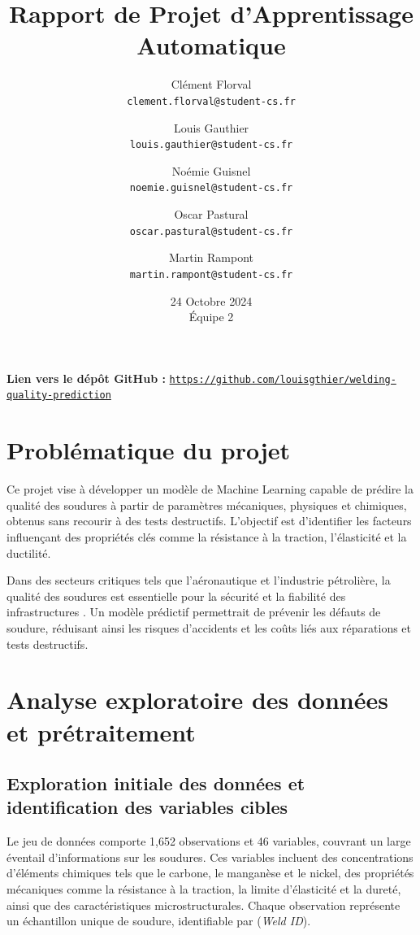 \documentclass{article}
\title{\LARGE \textbf{Rapport de Projet d'Apprentissage Automatique}}
\author{
    \normalsize Clément Florval\\
    \small \texttt{clement.florval@student-cs.fr}
    \and
    \normalsize Louis Gauthier\\
    \small \texttt{louis.gauthier@student-cs.fr}
    \and
    \normalsize Noémie Guisnel\\
    \small \texttt{noemie.guisnel@student-cs.fr}
    \and
    \normalsize Oscar Pastural\\
    \small \texttt{oscar.pastural@student-cs.fr}
    \and
    \normalsize Martin Rampont\\
    \small \texttt{martin.rampont@student-cs.fr}
}
\date{\normalsize 24 Octobre 2024 \\ \small Équipe 2}
\newcommand{\bcite}[1]{\textbf{\cite{#1}}}
\begin{document}
\maketitle
\tableofcontents

\vfill
\noindent
\textbf{Lien vers le dépôt GitHub :} \href{https://github.com/louisgthier/welding-quality-prediction}{\texttt{https://github.com/louisgthier/welding-quality-prediction}}
\vspace*{1cm} 

\newpage
\section{Problématique du projet}

Ce projet vise à développer un modèle de Machine Learning capable de prédire la qualité des soudures à partir de paramètres mécaniques, physiques et chimiques, obtenus sans recourir à des tests destructifs. L'objectif est d'identifier les facteurs influençant des propriétés clés comme la résistance à la traction, l'élasticité et la ductilité.

Dans des secteurs critiques tels que l'aéronautique et l'industrie pétrolière, la qualité des soudures est essentielle pour la sécurité et la fiabilité des infrastructures \bcite{olympus,controle-visuel}. Un modèle prédictif permettrait de prévenir les défauts de soudure, réduisant ainsi les risques d'accidents et les coûts liés aux réparations et tests destructifs.

\section{Analyse exploratoire des données et prétraitement}

\subsection{Exploration initiale des données et identification des variables cibles}

Le jeu de données comporte 1,652 observations et 46 variables, couvrant un large éventail d'informations sur les soudures. Ces variables incluent des concentrations d'éléments chimiques tels que le carbone, le manganèse et le nickel, des propriétés mécaniques comme la résistance à la traction, la limite d’élasticité et la dureté, ainsi que des caractéristiques microstructurales. Chaque observation représente un échantillon unique de soudure, identifiable par (\textit{Weld ID}).
\end{document}
